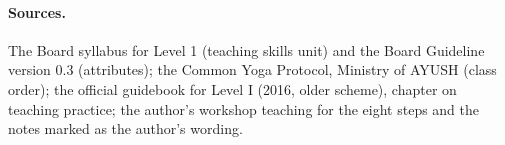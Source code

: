 \paragraph{Sources.} The Board syllabus for Level 1 (teaching skills unit) and the Board Guideline version 0.3 (attributes); the Common Yoga Protocol, Ministry of AYUSH (class order); the official guidebook for Level I (2016, older scheme), chapter on teaching practice; the author's workshop teaching for the eight steps and the notes marked as the author's wording.
